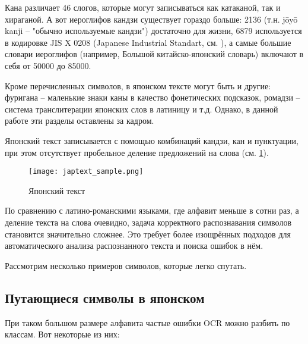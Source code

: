 Кана различает 46 слогов, которые могут записываться как катаканой, так и хираганой. А вот иероглифов кандзи существует гораздо больше: 2136 (т.н. jōyō kanji -- "обычно используемые кандзи") достаточно для жизни, 6879 используется в кодировке JIS X 0208 (Japanese Industrial Standart, см. \cite{JISX0208}), а самые большие словари иероглифов (например, Большой китайско-японский словарь) включают в себя от 50000 до 85000.

Кроме перечисленных символов, в японском тексте могут быть и другие: фуригана -- маленькие знаки каны в качество фонетических подсказок, ромадзи -- система транслитерации японских слов в латиницу и т.д. Однако, в данной работе эти разделы оставлены за кадром.

Японский текст записывается с помощью комбинаций кандзи, кан и пунктуации, при этом отсутствует пробельное деление предложений на слова (см. \cref{fig:japtext_sample}).
	\begin{figure}[H]
	\centering
	\texttt{[image: japtext\_sample.png]}
	\caption{Японский текст}
	\label{fig:japtext_sample}
\end{figure}

По сравнению с латино-романскими языками, где алфавит меньше в сотни раз, а деление текста на слова очевидно, задача корректного распознавания символов становится значительно сложнее. Это требует более изощрённых подходов для автоматического анализа распознанного текста и поиска ошибок в нём.

Рассмотрим несколько примеров символов, которые легко спутать.

\subsection{ Путающиеся символы в японском }

При таком большом размере алфавита частые ошибки OCR можно разбить по классам. Вот некоторые из них:

